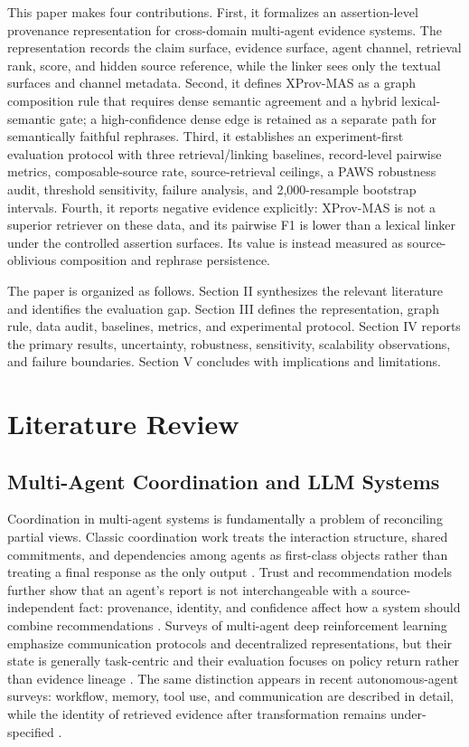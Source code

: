 \documentclass{ieeeaccess}
\begin{document}
This paper makes four contributions. First, it formalizes an assertion-level provenance representation for cross-domain multi-agent evidence systems. The representation records the claim surface, evidence surface, agent channel, retrieval rank, score, and hidden source reference, while the linker sees only the textual surfaces and channel metadata. Second, it defines XProv-MAS as a graph composition rule that requires dense semantic agreement and a hybrid lexical-semantic gate; a high-confidence dense edge is retained as a separate path for semantically faithful rephrases. Third, it establishes an experiment-first evaluation protocol with three retrieval/linking baselines, record-level pairwise metrics, composable-source rate, source-retrieval ceilings, a PAWS robustness audit, threshold sensitivity, failure analysis, and 2,000-resample bootstrap intervals. Fourth, it reports negative evidence explicitly: XProv-MAS is not a superior retriever on these data, and its pairwise F1 is lower than a lexical linker under the controlled assertion surfaces. Its value is instead measured as source-oblivious composition and rephrase persistence.

The paper is organized as follows. Section II synthesizes the relevant literature and identifies the evaluation gap. Section III defines the representation, graph rule, data audit, baselines, metrics, and experimental protocol. Section IV reports the primary results, uncertainty, robustness, sensitivity, scalability observations, and failure boundaries. Section V concludes with implications and limitations.

\section{Literature Review}
\subsection{Multi-Agent Coordination and LLM Systems}
Coordination in multi-agent systems is fundamentally a problem of reconciling partial views. Classic coordination work treats the interaction structure, shared commitments, and dependencies among agents as first-class objects rather than treating a final response as the only output \cite{Anont4666174668}. Trust and recommendation models further show that an agent's report is not interchangeable with a source-independent fact: provenance, identity, and confidence affect how a system should combine recommendations \cite{Anona580079021x}. Surveys of multi-agent deep reinforcement learning emphasize communication protocols and decentralized representations, but their state is generally task-centric and their evaluation focuses on policy return rather than evidence lineage \cite{Anonm202109996w,Anona8023096336}. The same distinction appears in recent autonomous-agent surveys: workflow, memory, tool use, and communication are described in detail, while the identity of retrieved evidence after transformation remains under-specified \cite{Anona6024000092,Anona6024000092}.
\end{document}
